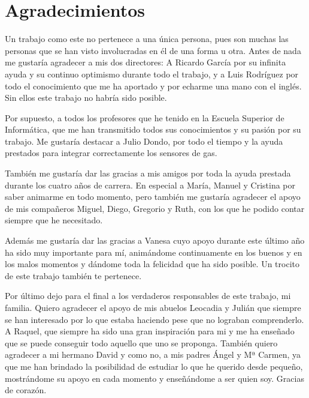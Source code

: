 \chapter{Agradecimientos} %

Un trabajo como este no pertenece a una única persona, pues son muchas las personas que se han visto involucradas en él de una forma u otra. Antes de nada me gustaría agradecer a mis dos directores: A Ricardo García por su infinita ayuda y su continuo optimismo durante todo el trabajo, y a Luis Rodríguez por todo el conocimiento que me ha aportado y por echarme una mano con el inglés. Sin ellos este trabajo no habría sido posible.

Por supuesto, a todos los profesores que he tenido en la Escuela Superior de Informática, que me han transmitido todos sus conocimientos y su pasión por su trabajo. Me gustaría destacar a Julio Dondo, por todo el tiempo y la ayuda prestados para integrar correctamente los sensores de gas. 

También me gustaría dar las gracias a mis amigos por toda la ayuda prestada durante los cuatro años de carrera. En especial a María, Manuel y Cristina por saber animarme en todo momento, pero también me gustaría agradecer el apoyo de mis compañeros Miguel, Diego, Gregorio y Ruth, con los que he podido contar siempre que he necesitado.

Además me gustaría dar las gracias a Vanesa cuyo apoyo durante este último año ha sido muy importante para mí, animándome continuamente en los buenos y en los malos momentos y dándome toda la felicidad que ha sido posible. Un trocito de este trabajo también te pertenece.

Por último dejo para el final a los verdaderos responsables de este trabajo, mi familia. Quiero agradecer el apoyo de mis abuelos Leocadia y Julián que siempre se han interesado por lo que estaba haciendo pese que no lograban comprenderlo. A Raquel, que siempre ha sido una gran inspiración para mi y me ha enseñado que se puede conseguir todo aquello que uno se proponga. También quiero agradecer a mi hermano David y como no, a mis padres Ángel y Mª Carmen, ya que me han brindado la posibilidad de estudiar lo que he querido desde pequeño, mostrándome su apoyo en cada momento y enseñándome a ser quien soy. Gracias de corazón.

